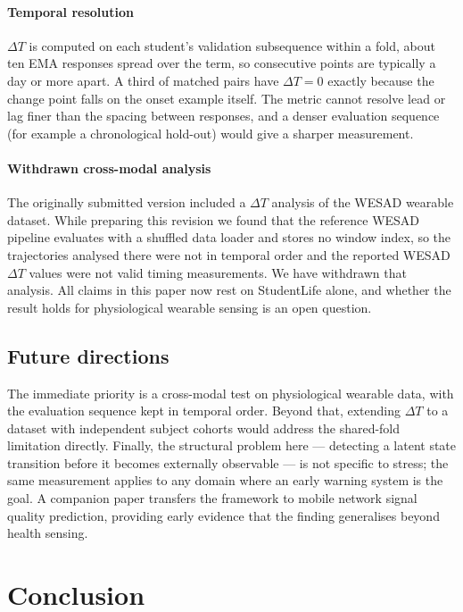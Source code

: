 \documentclass[preprint,12pt,authoryear]{elsarticle}
\newcommand{\dt}{$\Delta T$}
\begin{document}
\paragraph{Temporal resolution} \dt{} is computed on each student's
validation subsequence within a fold, about ten EMA responses spread
over the term, so consecutive points are typically a day or more apart.
A third of matched pairs have $\Delta T = 0$ exactly because the change
point falls on the onset example itself. The metric cannot resolve
lead or lag finer than the spacing between responses, and a denser
evaluation sequence (for example a chronological hold-out) would give a
sharper measurement.

\paragraph{Withdrawn cross-modal analysis} The originally submitted
version included a \dt{} analysis of the WESAD wearable dataset. While
preparing this revision we found that the reference WESAD pipeline
evaluates with a shuffled data loader and stores no window index, so
the trajectories analysed there were not in temporal order and the
reported WESAD \dt{} values were not valid timing measurements. We have
withdrawn that analysis. All claims in this paper now rest on
StudentLife alone, and whether the result holds for physiological
wearable sensing is an open question.

\subsection{Future directions}

The immediate priority is a cross-modal test on physiological
wearable data, with the evaluation sequence kept in temporal order.
Beyond that, extending \dt{} to
a dataset with independent subject cohorts would address the shared-fold
limitation directly. Finally, the structural problem here --- detecting
a latent state transition before it becomes externally observable ---
is not specific to stress; the same measurement applies to any domain
where an early warning system is the goal. A companion paper transfers
the framework to mobile network signal quality prediction, providing
early evidence that the finding generalises beyond health sensing.

\section{Conclusion}
\end{document}
